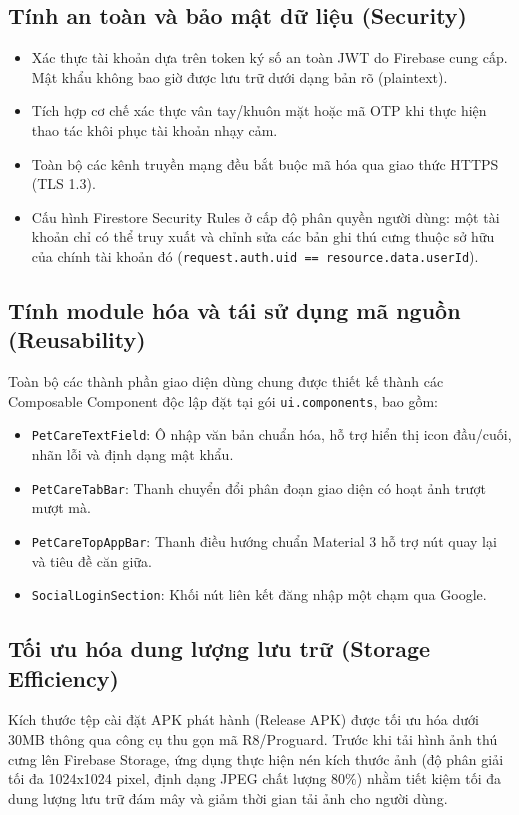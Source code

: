 \subsection{Tính an toàn và bảo mật dữ liệu (Security)}
\begin{itemize}
    \item Xác thực tài khoản dựa trên token ký số an toàn JWT do Firebase cung cấp. Mật khẩu không bao giờ được lưu trữ dưới dạng bản rõ (plaintext).
    \item Tích hợp cơ chế xác thực vân tay/khuôn mặt hoặc mã OTP khi thực hiện thao tác khôi phục tài khoản nhạy cảm.
    \item Toàn bộ các kênh truyền mạng đều bắt buộc mã hóa qua giao thức HTTPS (TLS 1.3).
    \item Cấu hình Firestore Security Rules ở cấp độ phân quyền người dùng: một tài khoản chỉ có thể truy xuất và chỉnh sửa các bản ghi thú cưng thuộc sở hữu của chính tài khoản đó (\texttt{request.auth.uid == resource.data.userId}).
\end{itemize}

\subsection{Tính module hóa và tái sử dụng mã nguồn (Reusability)}
Toàn bộ các thành phần giao diện dùng chung được thiết kế thành các Composable Component độc lập đặt tại gói \texttt{ui.components}, bao gồm:
\begin{itemize}
    \item \texttt{PetCareTextField}: Ô nhập văn bản chuẩn hóa, hỗ trợ hiển thị icon đầu/cuối, nhãn lỗi và định dạng mật khẩu.
    \item \texttt{PetCareTabBar}: Thanh chuyển đổi phân đoạn giao diện có hoạt ảnh trượt mượt mà.
    \item \texttt{PetCareTopAppBar}: Thanh điều hướng chuẩn Material 3 hỗ trợ nút quay lại và tiêu đề căn giữa.
    \item \texttt{SocialLoginSection}: Khối nút liên kết đăng nhập một chạm qua Google.
\end{itemize}

\subsection{Tối ưu hóa dung lượng lưu trữ (Storage Efficiency)}
Kích thước tệp cài đặt APK phát hành (Release APK) được tối ưu hóa dưới 30MB thông qua công cụ thu gọn mã R8/Proguard. Trước khi tải hình ảnh thú cưng lên Firebase Storage, ứng dụng thực hiện nén kích thước ảnh (độ phân giải tối đa 1024x1024 pixel, định dạng JPEG chất lượng 80\%) nhằm tiết kiệm tối đa dung lượng lưu trữ đám mây và giảm thời gian tải ảnh cho người dùng.

